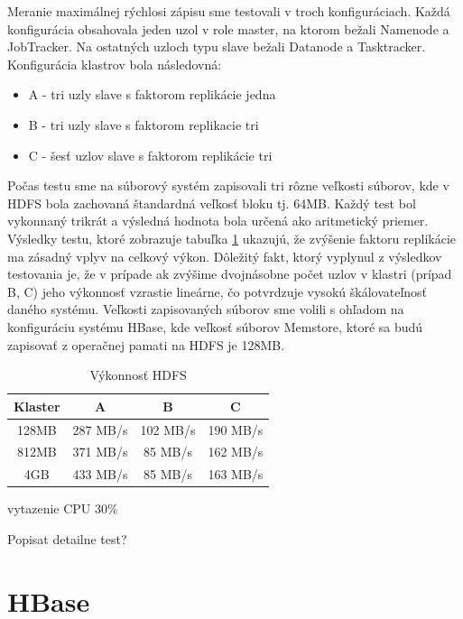 \documentclass[11pt,twoside,a4paper]{book}
\begin{document}
Meranie maximálnej rýchlosi zápisu sme testovali v troch konfiguráciach. Každá konfigurácia obsahovala jeden uzol v role master, na ktorom bežali Namenode a JobTracker. Na ostatných uzloch typu slave bežali Datanode a Tasktracker. Konfigurácia klastrov bola následovná:

\begin{itemize}
 \item A - tri uzly slave s faktorom replikácie jedna
 \item B - tri uzly slave s faktorom replikacie tri
 \item C - šesť uzlov slave s faktorom replikácie tri
\end{itemize}

Počas testu sme na súborový systém zapisovali tri rôzne veľkosti súborov, kde v HDFS bola zachovaná štandardná veľkosť bloku tj. 64MB. Každý test bol vykonnaný trikrát a výsledná hodnota bola určená ako aritmetický priemer. Výsledky testu, ktoré zobrazuje tabuľka \ref{tab:HDFSperformance} ukazujú, že zvýšenie faktoru replikácie ma zásadný vplyv na celkový výkon. Dôležitý fakt, ktorý vyplynul z výsledkov testovania je, že v prípade ak zvýšime dvojnásobne počet uzlov v klastri (prípad B, C) jeho výkonnosť vzrastie lineárne, čo potvrdzuje vysokú škálovateľnosť daného systému. Veľkosti zapisovaných súborov sme volili s ohľadom na konfiguráciu systému HBase, kde veľkosť súborov Memstore, ktoré sa budú zapisovať z operačnej pamati na HDFS je 128MB.
 

\begin{table}[htbp]
\begin{center}
\begin{tabular}{|c|c|c|c|}
\hline Klaster & A & B & C\\ 
\hline
\hline 128MB & 287 MB/s& 102 MB/s& 190 MB/s\\ 
\hline 812MB & 371 MB/s& 85 MB/s& 162 MB/s\\ 
\hline 4GB & 433 MB/s& 85 MB/s& 163 MB/s\\ 
\hline
\end{tabular} 
\end{center}
\caption{Výkonnosť HDFS}
\label{tab:HDFSperformance}
\end{table}

vytazenie CPU 30\%

Popisat detailne test?

\section{HBase}
\end{document}
